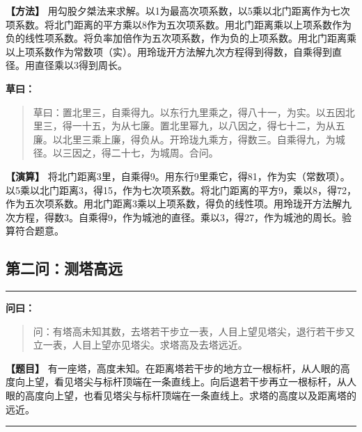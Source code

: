 \documentclass[11pt,a4paper]{article}
\newenvironment{mathproblem}[1][]{%
  \medskip\noindent\rule{\textwidth}{0.4pt}%
  \par\noindent{\Large\bfseries\color{sectioncolor}#1}\par\nopagebreak%
  \smallskip%
}{%
  \par\noindent\rule{\textwidth}{0.4pt}\medskip%
}
\newcommand{\wenlabel}{\textbf{\color{origcolor}问曰：}}
\newcommand{\caolabel}{\textbf{\color{origcolor}草曰：}}
\newcommand{\modwenlabel}{\textbf{\color{modcolor}【题目】}}
\newcommand{\modshulabel}{\textbf{\color{modcolor}【方法】}}
\newcommand{\modcaolabel}{\textbf{\color{modcolor}【演算】}}
\begin{document}
\begin{moderntext}
\modshulabel
用勾股夕桀法来求解。以1为最高次项系数，以5乘以北门距离作为七次项系数。将北门距离的平方乘以8作为五次项系数。用北门距离乘以上项系数作为负的线性项系数。将负率加倍作为五次项系数，作为负的上项系数。用北门距离乘以上项系数作为常数项（实）。用玲珑开方法解九次方程得到得数，自乘得到直径。用直径乘以3得到周长。
\end{moderntext}

\begin{originaltext}
\caolabel
\begin{quote}
\textcolor{origcolor}{%
草曰：置北里三，自乘得九。以东行九里乘之，得八十一，为实。以五因北里三，得一十五，为从七廉。置北里幂九，以八因之，得七十二，为从五廉。以北里三乘上廉，得负从。开玲珑九乘方，得数三。自乘得九，为城径。以三因之，得二十七，为城周。合问。
}
\end{quote}
\end{originaltext}

\begin{moderntext}
\modcaolabel
将北门距离3里，自乘得9。用东行9里乘它，得81，作为实（常数项）。以5乘以北门距离3，得15，作为七次项系数。将北门距离的平方9，乘以8，得72，作为五次项系数。用北门距离3乘以上项系数，得负的线性项。用玲珑开方法解九次方程，得数3。自乘得9，作为城池的直径。乘以3，得27，作为城池的周长。验算符合题意。
\end{moderntext}

\subsection*{第二问：测塔高远}

\begin{mathproblem}[\textbf{第二问：测塔高远}]

\begin{originaltext}
\wenlabel
\begin{quote}
\textcolor{origcolor}{%
问：有塔高未知其数，去塔若干步立一表，人目上望见塔尖，退行若干步又立一表，人目上望亦见塔尖。求塔高及去塔远近。
}
\end{quote}
\end{originaltext}

\begin{moderntext}
\modwenlabel
有一座塔，高度未知。在距离塔若干步的地方立一根标杆，从人眼的高度向上望，看见塔尖与标杆顶端在一条直线上。向后退若干步再立一根标杆，从人眼的高度向上望，也看见塔尖与标杆顶端在一条直线上。求塔的高度以及距离塔的远近。
\end{moderntext}

\end{mathproblem}
\end{document}
